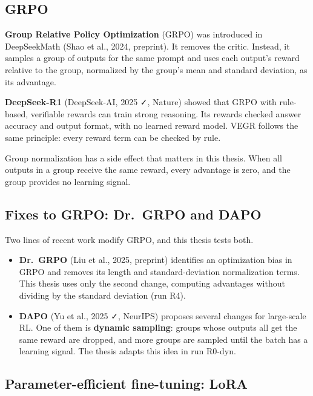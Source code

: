 \subsection{GRPO}\label{sec:2.5.2}

\textbf{Group Relative Policy Optimization} (GRPO) was introduced in
DeepSeekMath (Shao et al., 2024, preprint). It removes the critic.
Instead, it samples a group of outputs for the same prompt and uses each
output's reward relative to the group, normalized by the group's mean
and standard deviation, as its advantage.

\textbf{DeepSeek-R1} (DeepSeek-AI, 2025 ✓, Nature) showed that GRPO with
rule-based, verifiable rewards can train strong reasoning. Its rewards
checked answer accuracy and output format, with no learned reward model.
VEGR follows the same principle: every reward term can be checked by
rule.

Group normalization has a side effect that matters in this thesis. When
all outputs in a group receive the same reward, every advantage is zero,
and the group provides no learning signal.

\subsection{Fixes to GRPO: Dr.~GRPO and DAPO}\label{sec:2.5.3}

Two lines of recent work modify GRPO, and this thesis tests both.

\begin{itemize}
\tightlist
\item
  \textbf{Dr.~GRPO} (Liu et al., 2025, preprint) identifies an
  optimization bias in GRPO and removes its length and
  standard-deviation normalization terms. This thesis uses only the
  second change, computing advantages without dividing by the standard
  deviation (run R4).
\item
  \textbf{DAPO} (Yu et al., 2025 ✓, NeurIPS) proposes several changes
  for large-scale RL. One of them is \textbf{dynamic sampling}: groups
  whose outputs all get the same reward are dropped, and more groups are
  sampled until the batch has a learning signal. The thesis adapts this
  idea in run R0-dyn.
\end{itemize}

\subsection{Parameter-efficient fine-tuning: LoRA}\label{sec:2.5.4}

